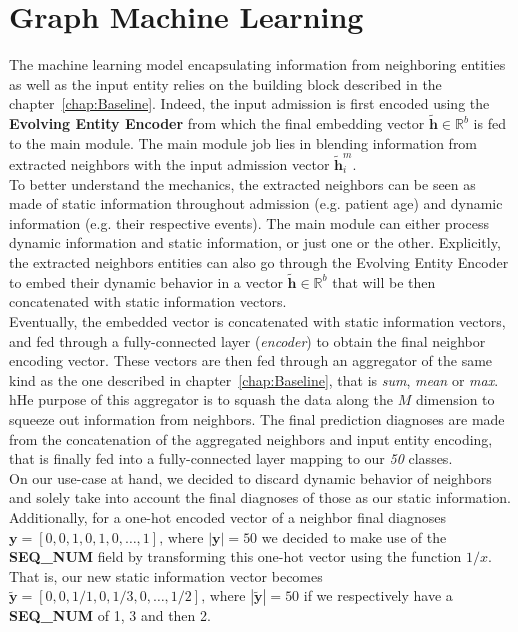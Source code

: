 \newpage
\section{Graph Machine Learning}
The machine learning model encapsulating information from neighboring entities as well as the input entity relies on the building block described in the chapter~\ref{chap:Baseline}. Indeed, the input admission is first encoded using the \textbf{Evolving Entity Encoder} from which the final embedding vector $\bm{\tilde{h}} \in \mathbb{R}^{b}$ is fed to the main module. The main module job lies in blending information from extracted neighbors with the input admission vector $\bm{\tilde{h}}_i^m$. \\

To better understand the mechanics, the extracted neighbors can be seen as made of static information throughout admission (e.g. patient age) and dynamic information (e.g. their respective events). The main module can either process dynamic information and static information, or just one or the other. Explicitly, the extracted neighbors entities can also go through the Evolving Entity Encoder to embed their dynamic behavior in a vector $\bm{\tilde{h}} \in \mathbb{R}^{b}$ that will be then concatenated with static information vectors. \\

Eventually, the embedded vector is concatenated with static information vectors, and fed through a fully-connected layer (\textit{encoder}) to obtain the final neighbor encoding vector. These vectors are then fed through an aggregator of the same kind as the one described in chapter~\ref{chap:Baseline}, that is \textit{sum}, \textit{mean} or \textit{max}. hHe purpose of this aggregator is to squash the data along the $M$ dimension to squeeze out information from neighbors. The final prediction diagnoses are made from the concatenation of the aggregated neighbors and input entity encoding, that is finally fed into a fully-connected layer mapping to our \emph{50} classes. \\

On our use-case at hand, we decided to discard dynamic behavior of neighbors and solely take into account the final diagnoses of those as our static information. Additionally, for a one-hot encoded vector of a neighbor final diagnoses $\bm{y}=[0, 0, 1, 0, 1, 0, \dots, 1]\mbox{, where }|\bm{y}|=50$ we decided to make use of the \textbf{SEQ\_NUM} field by transforming this one-hot vector using the function $1/x$. That is, our new static information vector becomes $\bm{\tilde{y}}=[0, 0, 1/1, 0, 1/3, 0, \dots, 1/2]\mbox{, where }|\bm{\tilde{y}}|=50$ if we respectively have a \textbf{SEQ\_NUM} of 1, 3 and then 2. \\

